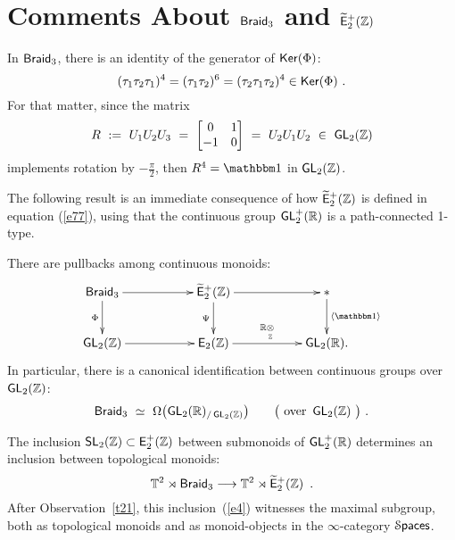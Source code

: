 \section{Comments About $\operatorname{{\sf Braid}_3}$ and $\operatorname{\widetilde{\sf E}_{2}^{+}(\mathbb Z)}$}





\begin{observation}
In $\operatorname{{\sf Braid}_3}$, there is an identity of the generator of $\operatorname{\sf Ker}(\Phi)$:
\[
(\tau_{1} \tau_{2} \tau_{1})^4 
=
( \tau_{1} \tau_{2})^6
=
(\tau_{2} \tau_{1} \tau_{2})^4
\in {\sf Ker}(\Phi)
~.
\]
For that matter, since the matrix
\begin{equation}
\label{e64}
R~:=~ U_1 U_2 U_3 ~=~ 
\begin{bmatrix}
0 & 1 
\\
-1 & 0
\end{bmatrix}
~=~
U_2 U_1 U_2
~\in~\operatorname{\sf GL}_2(\mathbb Z)
\end{equation}
implements rotation by $-\frac{\pi}{2}$, 
then $R^4 = \uno$ in $\operatorname{\sf GL}_2(\mathbb Z)$.

\end{observation}



The following result is an immediate consequence of how $\operatorname{\widetilde{\sf E}_{2}^{+}(\mathbb Z)}$ is defined in equation (\ref{e77}), using that the continuous group $\operatorname{\sf GL}^+_2(\mathbb R)$ is a path-connected 1-type.
\begin{cor}
\label{t31}
There are pullbacks among continuous monoids:
\begin{equation*}
\xymatrix{
\Braid
\ar[rr]
\ar[d]_-{\Phi}
&&
\Ebraid
\ar[d]_-{\Psi} \ar[rr]
&&
\ast \ar[d]^-{\lag \uno \rag}
\\
\GL_2(\ZZ)
\ar[rr]
&&
\EZ
\ar[rr]^-{\RR \underset{\ZZ}\ot}
&&
\GL_2(\RR)
.
}
\end{equation*}
In particular, there is a canonical identification between continuous groups over $\operatorname{\sf GL}_2(\mathbb Z)$:
\[
\operatorname{{\sf Braid}_3}
~\simeq~
\Omega\bigl(
\operatorname{\sf GL}_2(\mathbb R)_{/\operatorname{\sf GL}_2(\mathbb Z)}
\bigr)
\qquad
\bigl({\rm ~over~}
\operatorname{\sf GL}_2(\mathbb Z)
~\bigr)
~.
\]

\end{cor}







\begin{observation}
\label{t39}
The inclusion $\operatorname{\sf SL}_2(\mathbb Z)\subset \operatorname{\mathsf E^+_2(\mathbb Z)}$ between submonoids of $\operatorname{\sf GL}_2^+(\mathbb R)$ determines an inclusion between topological monoids:
\begin{equation}
\label{e4}
\mathbb T^2 \rtimes \operatorname{{\sf Braid}_3}
\longrightarrow
\mathbb T^2 \rtimes \operatorname{\widetilde{\sf E}_{2}^{+}(\mathbb Z)}
~.
\end{equation}
After Observation~\ref{t21}, this inclusion~(\ref{e4}) witnesses the maximal subgroup, both as topological monoids and as monoid-objects in the $\infty$-category $\operatorname{\mathcal S\mathsf{paces}}$.

\end{observation}







